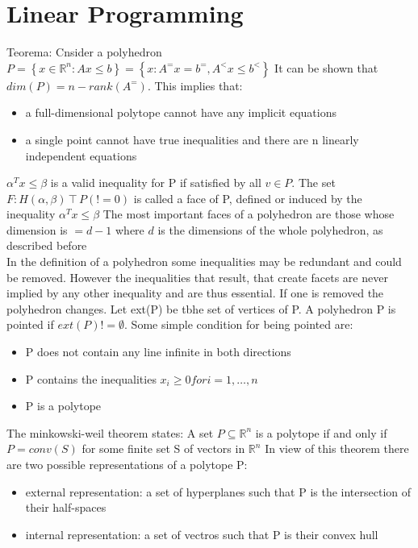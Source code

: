 \section{Linear Programming}
Teorema: Cnsider a polyhedron
    $P = \left\{ x \in \mathbb{R}^n : Ax\leq b \right\} = \left\{ x: A^=x = b^=, A^<x \leq b^< \right\}$
    It can be shown that $dim(P) = n - rank(A^=)$.
    This implies that:
    \begin{itemize}
        \item a full-dimensional polytope cannot have any implicit equations
        \item a single point cannot have true inequalities and there are n linearly independent equations
    \end{itemize}
    $\alpha^T x \leq \beta$ is a valid inequality for P if satisfied by all $v \in P$. The set $F: H(\alpha, \beta) \intercal P(!=0)$ is called a face of P, defined or induced by the inequality
    $\alpha^T x \leq \beta$
    The most important faces of a polyhedron are those whose dimension is $ = d- 1$ where $d$ is the dimensions of the whole polyhedron, as described before\\
    In the definition of a polyhedron some inequalities may be redundant and could be removed. However the inequalities that result, that create
    facets are never implied by any other inequality and are thus essential. If one is removed the polyhedron changes. \newline
    Let ext(P) be tbhe set of vertices of P. A polyhedron P is pointed if $ext(P) != \emptyset$. Some simple condition for being pointed are:
    \begin{itemize}
        \item P does not contain any line infinite in both directions
        \item P contains the inequalities $x_i \geq 0 for i= 1, \ldots, n$
        \item P is a polytope
    \end{itemize}
    The minkowski-weil theorem states: A set $P \subseteq \mathbb{R}^n $ is a polytope if and only if $P = conv(S)$ for some finite set S of vectors in $\mathbb{R}^n$
    In view of this theorem there are two possible representations of a polytope P:
    \begin{itemize}
        \item external representation: a set of hyperplanes such that P is the intersection of their half-spaces
        \item internal representation: a set of vectros such that P is their convex hull
    \end{itemize}

